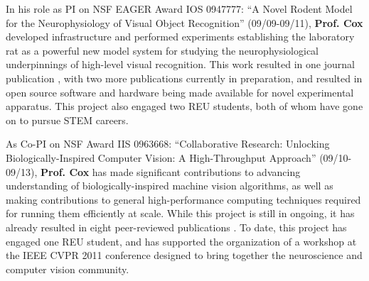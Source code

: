 In his role as PI on NSF EAGER Award IOS 0947777: ``A Novel Rodent Model for the Neurophysiology of Visual Object Recognition'' (09/09-09/11), {\bf Prof. Cox} developed infrastructure and performed experiments establishing the laboratory rat as a powerful new model system for studying the neurophysiological underpinnings of high-level visual recognition. This work resulted in one journal publication \cite{zoccolan:frontiers_2010}, with two more publications currently in preparation, and resulted in open source software and hardware being made available for novel experimental apparatus. This project also engaged two REU students, both of whom have gone on to pursue STEM careers.

As Co-PI on NSF Award IIS 0963668: ``Collaborative Research: Unlocking Biologically-Inspired Computer Vision: A High-Throughput Approach'' (09/10-09/13), {\bf Prof. Cox} has made significant contributions to advancing understanding of biologically-inspired machine vision algorithms, as well as making contributions to general high-performance computing techniques required for running them efficiently at scale.
While this project is still in ongoing, it has already resulted in eight peer-reviewed publications \cite{vig:eccv_2012, bergstra:inpar_2012, vig:icip_2012, pinto:fg_2011, pinto:bionetics_2010, pinto:gcg2, pinto:cvpr_ws_2011, pinto:imavis_2012, chiachia:bmvc_2012}.  To date, this project has engaged one REU student, and has supported the organization of a workshop at the IEEE CVPR 2011 conference designed to bring together the neuroscience and computer vision community.
